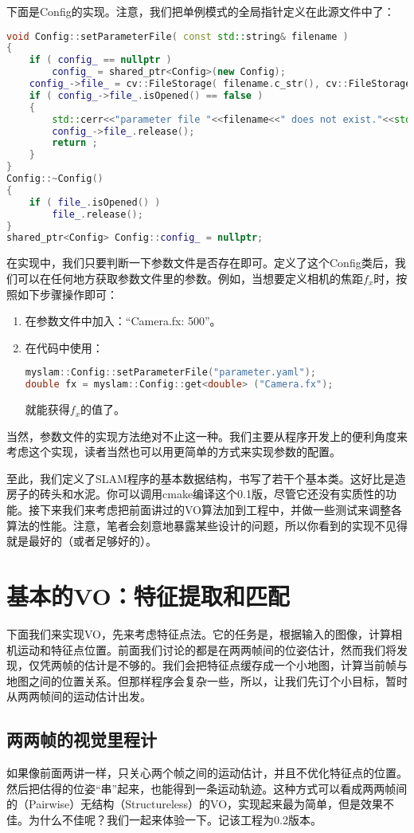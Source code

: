 下面是Config的实现。注意，我们把单例模式的全局指针定义在此源文件中了：
\begin{lstlisting}[language=c++,caption=slambook/project/0.1/src/config.cpp]
void Config::setParameterFile( const std::string& filename )
{
	if ( config_ == nullptr )
		config_ = shared_ptr<Config>(new Config);
	config_->file_ = cv::FileStorage( filename.c_str(), cv::FileStorage::READ );
	if ( config_->file_.isOpened() == false )
	{
		std::cerr<<"parameter file "<<filename<<" does not exist."<<std::endl;
		config_->file_.release();
		return ;
	}
}
Config::~Config()
{
	if ( file_.isOpened() )
		file_.release();
}
shared_ptr<Config> Config::config_ = nullptr;
\end{lstlisting}

在实现中，我们只要判断一下参数文件是否存在即可。定义了这个Config类后，我们可以在任何地方获取参数文件里的参数。例如，当想要定义相机的焦距$f_x$时，按照如下步骤操作即可：

\begin{enumerate}
	\item 在参数文件中加入：“Camera.fx: 500”。
	\item 在代码中使用：
\begin{lstlisting}[language=c++]
myslam::Config::setParameterFile("parameter.yaml");
double fx = myslam::Config::get<double> ("Camera.fx");
\end{lstlisting}
	就能获得$f_x$的值了。
\end{enumerate}
当然，参数文件的实现方法绝对不止这一种。我们主要从程序开发上的便利角度来考虑这个实现，读者当然也可以用更简单的方式来实现参数的配置。

至此，我们定义了SLAM程序的基本数据结构，书写了若干个基本类。这好比是造房子的砖头和水泥。你可以调用cmake编译这个0.1版，尽管它还没有实质性的功能。接下来我们来考虑把前面讲过的VO算法加到工程中，并做一些测试来调整各算法的性能。注意，笔者会刻意地暴露某些设计的问题，所以你看到的实现不见得就是最好的（或者足够好的）。

\section{基本的VO：特征提取和匹配}
下面我们来实现VO，先来考虑特征点法。它的任务是，根据输入的图像，计算相机运动和特征点位置。前面我们讨论的都是在两两帧间的位姿估计，然而我们将发现，仅凭两帧的估计是不够的。我们会把特征点缓存成一个小地图，计算当前帧与地图之间的位置关系。但那样程序会复杂一些，所以，让我们先订个小目标，暂时从两两帧间的运动估计出发。

\subsection{两两帧的视觉里程计}
如果像前面两讲一样，只关心两个帧之间的运动估计，并且不优化特征点的位置。然后把估得的位姿“串”起来，也能得到一条运动轨迹。这种方式可以看成两两帧间的（Pairwise）无结构（Structureless）的VO，实现起来最为简单，但是效果不佳。为什么不佳呢？我们一起来体验一下。记该工程为0.2版本。


